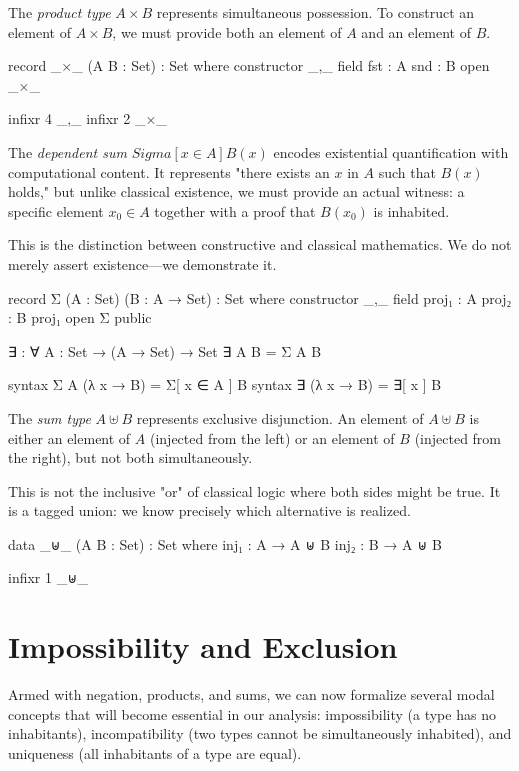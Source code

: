 \documentclass[11pt,a4paper]{book}
\def\Sigma{Sigma}%
\begin{document}
The \emph{product type} $A \times B$ represents simultaneous possession. To construct 
an element of $A \times B$, we must provide both an element of $A$ and an element of $B$.

\begin{code}
record _×_ (A B : Set) : Set where
  constructor _,_
  field
    fst : A
    snd : B
open _×_

infixr 4 _,_
infixr 2 _×_
\end{code}

The \emph{dependent sum} $\Sigma[ x \in A ] B(x)$ encodes existential quantification 
with computational content. It represents "there exists an $x$ in $A$ such that $B(x)$ holds," 
but unlike classical existence, we must provide an actual witness: a specific element $x_0 \in A$ 
together with a proof that $B(x_0)$ is inhabited.

This is the distinction between constructive and classical mathematics. We do not merely 
assert existence—we demonstrate it.

\begin{code}
record Σ (A : Set) (B : A → Set) : Set where
  constructor _,_
  field
    proj₁ : A
    proj₂ : B proj₁
open Σ public

∃ : ∀ {A : Set} → (A → Set) → Set
∃ {A} B = Σ A B

syntax Σ A (λ x → B) = Σ[ x ∈ A ] B
syntax ∃ (λ x → B) = ∃[ x ] B
\end{code}

The \emph{sum type} $A \uplus B$ represents exclusive disjunction. An element of 
$A \uplus B$ is either an element of $A$ (injected from the left) or an element of $B$ 
(injected from the right), but not both simultaneously.

This is not the inclusive "or" of classical logic where both sides might be true. 
It is a tagged union: we know precisely which alternative is realized.

\begin{code}
data _⊎_ (A B : Set) : Set where
  inj₁ : A → A ⊎ B
  inj₂ : B → A ⊎ B

infixr 1 _⊎_
\end{code}

\section{Impossibility and Exclusion}

Armed with negation, products, and sums, we can now formalize several modal concepts 
that will become essential in our analysis: impossibility (a type has no inhabitants), 
incompatibility (two types cannot be simultaneously inhabited), and uniqueness (all 
inhabitants of a type are equal).
\end{document}
